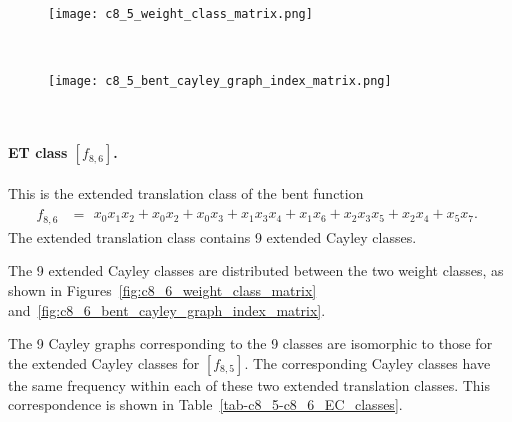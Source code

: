 \documentclass[12pt,a4paper]{article}
\newcommand{\mb}[1]{\mathbb{#1}}
\newcommand{\F}{\mb{F}}
\begin{document}
\begin{figure}[!bhpt] %
\centering
\begin{minipage}{.48\textwidth}
  \centering
  \texttt{[image: c8\_5\_weight\_class\_matrix.png]}
  \label{fig:c8_5_weight_class_matrix}
\end{minipage}%
~~~~
\begin{minipage}{.48\textwidth}
  \centering
  \texttt{[image: c8\_5\_bent\_cayley\_graph\_index\_matrix.png]}
  \label{fig:c8_5_bent_cayley_graph_index_matrix}
\end{minipage}
\end{figure}
~
\paragraph*{ET class $[f_{8,6}]$.}
%
%
This is the extended translation class of the bent function
\small{}
\begin{align*}
f_{ 8 , 6 } &=
\begin{array}{l}
x_{0} x_{1} x_{2} + x_{0} x_{2} + x_{0} x_{3} + x_{1} x_{3} x_{4} + x_{1} x_{6} + x_{2} x_{3} x_{5}
+ x_{2} x_{4} + x_{5} x_{7}.
\end{array}
\end{align*}
\normalsize{}
The extended translation class contains 9 extended Cayley classes.

The 9 extended Cayley classes are distributed between the two weight classes,
as shown in Figures~\ref{fig:c8_6_weight_class_matrix} and~\ref{fig:c8_6_bent_cayley_graph_index_matrix}.

The 9 Cayley graphs corresponding to the 9 classes are isomorphic to those for the extended Cayley classes for $[f_{8,5}]$.
The corresponding Cayley classes have the same frequency within each of these two extended translation classes.
This correspondence is shown in Table~\ref{tab-c8_5-c8_6_EC_classes}.
\end{document}
